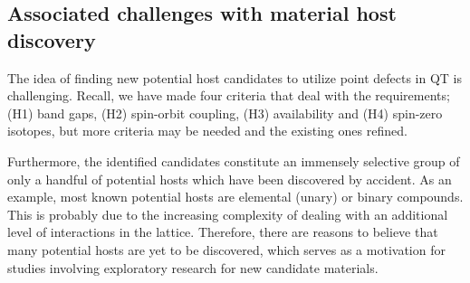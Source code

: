 \subsection{Associated challenges with material host discovery}

The idea of finding new potential host candidates to utilize point defects in QT is challenging. Recall, we have made four criteria that deal with the requirements; (H1) band gaps, (H2) spin-orbit coupling, (H3) availability and (H4) spin-zero isotopes, but more criteria may be needed and the existing ones refined.%

Furthermore, the identified candidates constitute an immensely selective group of only a handful of potential hosts which have been discovered by accident. As an example, most known potential hosts are elemental (unary) or binary compounds. This is probably due to the increasing complexity of dealing with an additional level of interactions in the lattice. Therefore, there are reasons to believe that many potential hosts are yet to be discovered, which serves as a motivation for studies involving exploratory research for new candidate materials.






\clearpage
